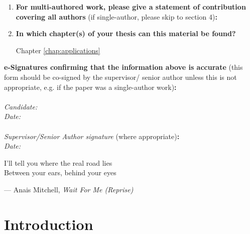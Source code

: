 \documentclass[12pt,phd,a4paper,twoside]{ucl_thesis}
\newcommand\citeauthorfullname{\nextcitefullname\citeauthor} %
\newcommand\epigraph[2]{\begin{flushright}
    \parbox{0.75\textwidth}{\raggedleft #1}
    \vskip 1.5\baselineskip
    --- #2
  \end{flushright}}
\newcommand\epipage[2]{\clearpage\thispagestyle{empty}
  \vspace*{\fill}
  {\sffamily\epigraph{#1}{#2}}
  \vspace*{\fill}\pagebreak
}
\providecommand{\DIFaddbegin}{} %
\providecommand{\DIFaddend}{} %
\providecommand{\DIFdelbegin}{} %
\providecommand{\DIFdelend}{} %
\newcommand{\DIFscaledelfig}{0.5}
\newlength{\DIFdelgraphicswidth} %
\newlength{\DIFdelgraphicsheight} %
\newcommand{\DIFaddincludegraphics}[2][]{{\color{blue}\fbox{\DIFOincludegraphics[#1]{#2}}}} %
\newcommand{\DIFdelincludegraphics}[2][]{%
\sbox{\DIFdelgraphicsbox}{\DIFOincludegraphics[#1]{#2}}%
\settoboxwidth{\DIFdelgraphicswidth}{\DIFdelgraphicsbox} %
\settoboxtotalheight{\DIFdelgraphicsheight}{\DIFdelgraphicsbox} %
\scalebox{\DIFscaledelfig}{%
\parbox[b]{\DIFdelgraphicswidth}{\usebox{\DIFdelgraphicsbox}\\[-\baselineskip] \rule{\DIFdelgraphicswidth}{0em}}\llap{\resizebox{\DIFdelgraphicswidth}{\DIFdelgraphicsheight}{%
\setlength{\unitlength}{\DIFdelgraphicswidth}%
\begin{picture}(1,1)%
\thicklines\linethickness{2pt} %
{\color[rgb]{1,0,0}\put(0,0){\framebox(1,1){}}}%
{\color[rgb]{1,0,0}\put(0,0){\line( 1,1){1}}}%
{\color[rgb]{1,0,0}\put(0,1){\line(1,-1){1}}}%
\end{picture}%
}\hspace*{3pt}}} %
} %
\DeclareRobustCommand{\DIFaddbegin}{\DIFOaddbegin \let\includegraphics\DIFaddincludegraphics} %
\DeclareRobustCommand{\DIFaddend}{\DIFOaddend \let\includegraphics\DIFOincludegraphics} %
\DeclareRobustCommand{\DIFdelbegin}{\DIFOdelbegin \let\includegraphics\DIFdelincludegraphics} %
\DeclareRobustCommand{\DIFdelend}{\DIFOaddend \let\includegraphics\DIFOincludegraphics} %
\begin{document}
{\begin{enumerate}[leftmargin=*,label={\bfseries\arabic*.}]
\begin{enumerate}[label={\alph*)}]
	\DIFdelbegin %
\DIFdelend \DIFaddbegin \citeauthorfullname*{Young2022a}
	\DIFaddend \item \textbf{Stage of publication:}

	Work presented at conference, no proceedings published.
\end{enumerate}

\item \textbf{For multi-authored work, please give a statement of contribution covering all authors} (if single-author, please skip to section 4)\textbf{:}
\item \textbf{In which chapter(s) of your thesis can this material be found?}

Chapter \ref{chap:applications}
\end{enumerate}

\textbf{e-Signatures confirming that the information above is accurate}
(this form should be co-signed by the supervisor/ senior author unless this is not appropriate, e.g. if the paper was a single-author work)\textbf{:}\\
\\[\baselineskip]
\textit{Candidate:}
\\[\baselineskip]
\textit{Date:}\\\signdate
\\[\baselineskip]
\textit{Supervisor/Senior Author signature} (where appropriate)\textbf{:}
\\[\baselineskip]
\textit{Date:}\\\signdate
} 
\tableofcontents
\setcounter{tocdepth}{1}
\listoffigures
\listoftables
{
\setlength{\glsdescwidth}{0.8\linewidth}
\printglossary[type=\acronymtype,title={List of Abbreviations}]
}
\clearpage{}

\epipage{I'll tell you where the real road lies\\
Between your ears, behind your eyes}{Anais Mitchell, \textit{Wait For Me (Reprise)}}
\clearpage{}\DIFaddbegin {}
\DIFaddend \chapter*{Introduction}
\label{chapterlabel0}
\end{document}
